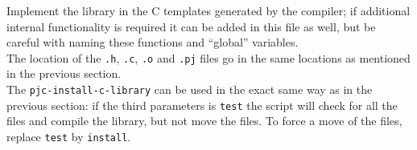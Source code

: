 \documentclass[pdflatex,11pt,letter]{article}
\begin{document}
\noindent
Implement the library in the C templates generated by the compiler; if additional 
internal functionality is required it can be added in this file as well, but be
careful with naming these functions and ``global'' variables.\\

\noindent
The location of the {\tt .h}, {\tt .c}, {\tt .o} and {\tt .pj} files 
go in the same locations as mentioned in the previous section.\\

\noindent
The {\tt pjc-install-c-library} can be used in the exact same way as
in the previous section: if the third parameters is {\tt test} the
script will check for all the files and compile the library, but not
move the files. To force a move of the files, replace {\tt test} by {\tt install}.
\end{document}
